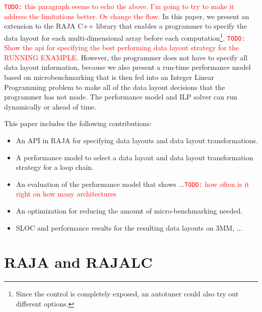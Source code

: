 \documentclass[sigconf, table]{acmart}
\newcommand{\todo}[1]{{\textcolor{red}{{\tt{TODO:}}\,\,#1 }}}
\begin{document}
\todo{this paragraph seems to echo the above. I'm going to try to make it address the limitations better. Or change the flow.}
In this paper, we present an extension to the RAJA C++ library that enables a programmer
to specify the data layout for each multi-dimensional array before each 
computation\footnote{Since the control is completely exposed, an autotuner could also try out different options.}.
\todo{Show the api for specifying the best performing data layout strategy
for the RUNNING EXAMPLE.}
However, the programmer does not have to specify all data layout information, because
we also present a run-time performance model based on microbenchmarking that is
then fed into an Integer Linear Programming problem to make all of the data layout decisions
that the programmer has not made.
The performance model and ILP solver can run dynamically or ahead of time.

This paper includes the following contributions:
\begin{itemize}
\item An API in RAJA for specifying data layouts and data layout transformations.
\item A performance model to select a data layout and data layout transformation strategy for 
         a loop chain.
\item An evaluation of the performance model that shows ...\todo{how often is it right on how many architectures}
\item An optimization for reducing the amount of micro-benchmarking needed.
\item SLOC and performance results for the resulting data layouts on 3MM, ...
\end{itemize} 


\section{RAJA and RAJALC}
\end{document}
